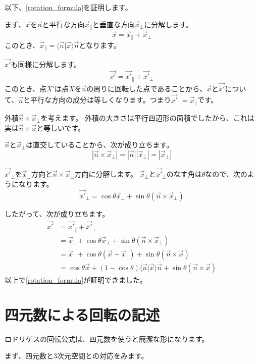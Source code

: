 \documentclass{jlreq}
\numberwithin{equation}{section}
\begin{document}
以下、\autoref{rotation_formula}を証明します。

まず、\(\vec{x}\)を\(\vec{n}\)と平行な方向\(\vec{x}_\parallel\)と垂直な方向\(\vec{x}_\perp\)に分解します。
\[
    \vec{x}=\vec{x}_\parallel+\vec{x}_\perp
\]
このとき、\(\vec{x}_\parallel=\langle\vec{n}|\vec{x}\rangle\vec{n}\)となります。

\(\vec{x'}\)も同様に分解します。
\[
    \vec{x'}=\vec{x'}_\parallel+\vec{x'}_\perp
\]
このとき、点\(X'\)は点\(X\)を\(\vec{n}\)の周りに回転した点であることから、\(\vec{x}\)と\(\vec{x'}\)について、\(\vec{n}\)と平行な方向の成分は等しくなります。つまり\(\vec{x'}_\parallel=\vec{x}_\parallel\)です。

外積\(\vec{n}\times\vec{x}_\perp\)を考えます。
外積の大きさは平行四辺形の面積でしたから、これは実は\(\vec{n}\times\vec{x}\)と等しいです。

\(\vec{n}\)と\(\vec{x}_\perp\)は直交していることから、次が成り立ちます。
\[
    |\vec{n}\times\vec{x}_\perp|=|\vec{n}||\vec{x}_\perp|=|\vec{x}_\perp|
\]

\(\vec{x'}_\perp\)を\(\vec{x}_\perp\)方向と\(\vec{n}\times\vec{x}_\perp\)方向に分解します。
\(\vec{x}_\perp\)と\(\vec{x'}_\perp\)のなす角は\(\theta\)なので、次のようになります。
\[
    \vec{x'}_\perp=\cos\theta\vec{x}_\perp+\sin\theta(\vec{n}\times\vec{x}_\perp)
\]

したがって、次が成り立ちます。
\begin{align}
    \vec{x'} & =\vec{x'}_\parallel+\vec{x'}_\perp                                                                     \\
             & =\vec{x}_\parallel+\cos\theta\vec{x}_\perp+\sin\theta(\vec{n}\times\vec{x}_\perp)                      \\
             & =\vec{x}_\parallel+\cos\theta(\vec{x}-\vec{x}_\parallel)+\sin\theta(\vec{n}\times\vec{x})              \\
             & =\cos\theta\vec{x}+(1-\cos\theta)\langle\vec{n}|\vec{x}\rangle\vec{n}+\sin\theta(\vec{n}\times\vec{x})
\end{align}
以上で\autoref{rotation_formula}が証明できました。

\section{四元数による回転の記述}

ロドリゲスの回転公式は、四元数を使うと簡潔な形になります。

まず、四元数と3次元空間との対応をみます。
\end{document}
